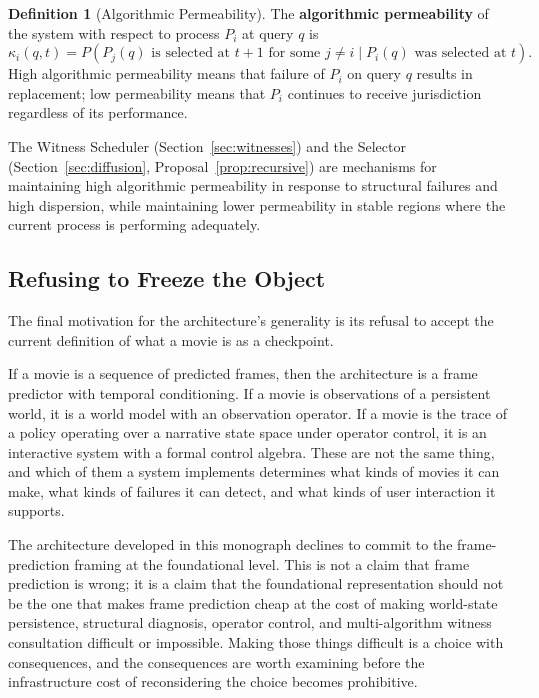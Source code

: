 \documentclass[11pt,a4paper]{article}
\theoremstyle{plain}
\theoremstyle{definition}
\newtheorem{definition}[theorem]{Definition}
\theoremstyle{remark}
\begin{document}
\begin{definition}[Algorithmic Permeability]
The \textbf{algorithmic permeability} of the system with respect to process $P_i$ at query $q$ is
\[
\kappa_i(q, t) = P(P_j(q) \text{ is selected at } t+1 \text{ for some } j \neq i \mid P_i(q) \text{ was selected at } t).
\]
High algorithmic permeability means that failure of $P_i$ on query $q$ results in replacement; low permeability means that $P_i$ continues to receive jurisdiction regardless of its performance.
\end{definition}

The Witness Scheduler (Section~\ref{sec:witnesses}) and the Selector (Section~\ref{sec:diffusion}, Proposal~\ref{prop:recursive}) are mechanisms for maintaining high algorithmic permeability in response to structural failures and high dispersion, while maintaining lower permeability in stable regions where the current process is performing adequately.

\subsection{Refusing to Freeze the Object}

The final motivation for the architecture's generality is its refusal to accept the current definition of what a movie is as a checkpoint.

If a movie is a sequence of predicted frames, then the architecture is a frame predictor with temporal conditioning. If a movie is observations of a persistent world, it is a world model with an observation operator. If a movie is the trace of a policy operating over a narrative state space under operator control, it is an interactive system with a formal control algebra. These are not the same thing, and which of them a system implements determines what kinds of movies it can make, what kinds of failures it can detect, and what kinds of user interaction it supports.

The architecture developed in this monograph declines to commit to the frame-prediction framing at the foundational level. This is not a claim that frame prediction is wrong; it is a claim that the foundational representation should not be the one that makes frame prediction cheap at the cost of making world-state persistence, structural diagnosis, operator control, and multi-algorithm witness consultation difficult or impossible. Making those things difficult is a choice with consequences, and the consequences are worth examining before the infrastructure cost of reconsidering the choice becomes prohibitive.
\end{document}
